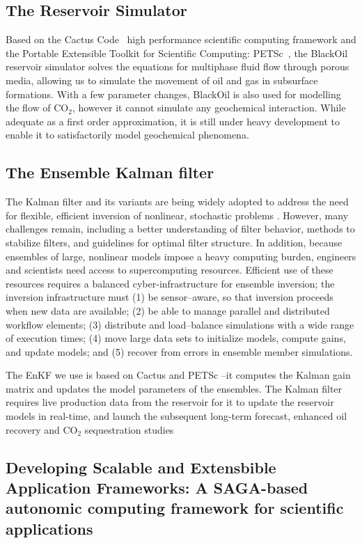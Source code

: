 \documentclass{rspublic}
\begin{document}
\subsection{The Reservoir Simulator} 

Based on the Cactus Code~\citep{cactus_web} high performance
scientific computing framework and the Portable Extensible Toolkit for
Scientific Computing: PETSc~\citep{PETSc}, the BlackOil reservoir
simulator solves the equations for multiphase fluid flow through
porous media, allowing us to simulate the movement of oil and gas in
subsurface formations. With a few parameter changes, BlackOil is also
used for modelling the flow of CO$_2$, however it cannot simulate any
geochemical interaction. While adequate as a first order
approximation, it is still under heavy development to enable it to
satisfactorily model geochemical phenomena.

\subsection{The Ensemble Kalman filter} 

The Kalman filter and its variants are being widely adopted to address
the need for flexible, efficient inversion of nonlinear, stochastic
problems \cite{DataAssim}. However, many challenges remain,
including a better understanding of filter behavior, methods to
stabilize filters, and guidelines for optimal filter structure. In
addition, because ensembles of large, nonlinear models impose a heavy
computing burden, engineers and scientists need access to
supercomputing resources. Efficient use of these resources requires a
balanced cyber-infrastructure for ensemble inversion; the inversion
infrastructure must (1) be sensor--aware, so that inversion proceeds
when new data are available; (2) be able to manage parallel and
distributed workflow elements; (3) distribute and load--balance
simulations with a wide range of execution times; (4) move large data
sets to initialize models, compute gains, and update models; and (5)
recover from errors in ensemble member simulations.

The EnKF we use is based on Cactus and PETSc --it computes the Kalman
gain matrix and updates the model parameters of the ensembles. The
Kalman filter requires live production data from the reservoir for it
to update the reservoir models in real-time, and launch the subsequent
long-term forecast, enhanced oil recovery and CO$_2$ sequestration
studies

\subsection{Developing Scalable and Extensbible Application
  Frameworks: A SAGA-based autonomic computing framework for
  scientific applications}
\end{document}

